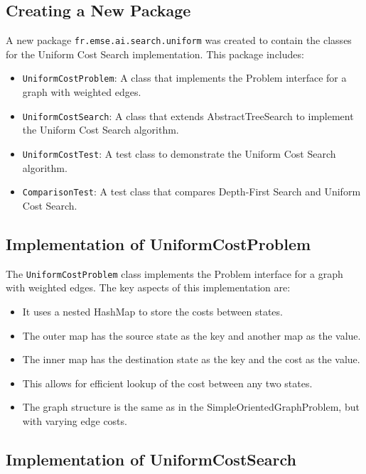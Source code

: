 \documentclass[12pt,a4paper]{article}
\begin{document}
\subsection{Creating a New Package}

A new package \texttt{fr.emse.ai.search.uniform} was created to contain the classes for the Uniform Cost Search implementation. This package includes:

\begin{itemize}
    \item \texttt{UniformCostProblem}: A class that implements the Problem interface for a graph with weighted edges.
    \item \texttt{UniformCostSearch}: A class that extends AbstractTreeSearch to implement the Uniform Cost Search algorithm.
    \item \texttt{UniformCostTest}: A test class to demonstrate the Uniform Cost Search algorithm.
    \item \texttt{ComparisonTest}: A test class that compares Depth-First Search and Uniform Cost Search.
\end{itemize}

\subsection{Implementation of UniformCostProblem}

The \texttt{UniformCostProblem} class implements the Problem interface for a graph with weighted edges. The key aspects of this implementation are:

\begin{itemize}
    \item It uses a nested HashMap to store the costs between states.
    \item The outer map has the source state as the key and another map as the value.
    \item The inner map has the destination state as the key and the cost as the value.
    \item This allows for efficient lookup of the cost between any two states.
    \item The graph structure is the same as in the SimpleOrientedGraphProblem, but with varying edge costs.
\end{itemize}

\subsection{Implementation of UniformCostSearch}
\end{document}
